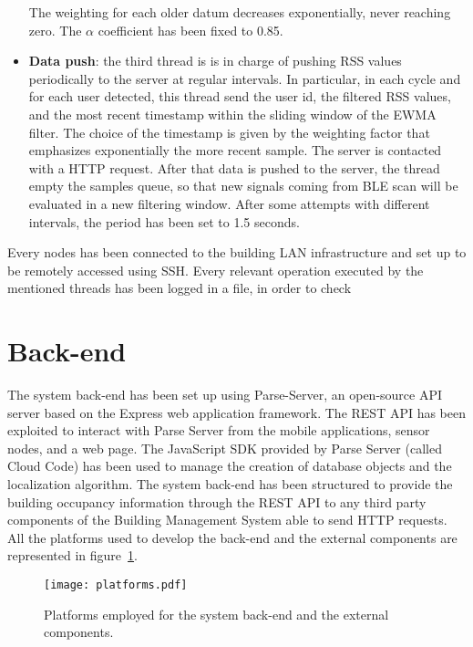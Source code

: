 \begin{itemize}
The weighting for each older datum decreases exponentially, never reaching zero. The $\alpha$ coefficient has been fixed to 0.85.
\item \textbf{Data push}: the third thread is is in charge of pushing RSS values periodically to the server at regular intervals. In particular, in each cycle and for each user detected, this thread send the user id, the filtered RSS values, and the most recent timestamp within the sliding window of the EWMA filter.
The choice of the timestamp is given by the weighting factor that emphasizes exponentially the more recent sample. The server is contacted with a HTTP request.
After that data is pushed to the server, the thread empty the samples queue, so that new signals coming from BLE scan will be evaluated in a new filtering window.
After some attempts with different intervals, the period has been set to 1.5 seconds.
\end{itemize}

Every nodes has been connected to the building LAN infrastructure and set up to be remotely accessed using SSH. Every relevant operation executed by the mentioned threads has been logged in a file, in order to check 

\section{Back-end}
\label{sec:back-end}
The system back-end has been set up using Parse-Server, an open-source API server based on the Express web application framework. The REST API has been exploited to interact with Parse Server from the mobile applications, sensor nodes, and a web page. The JavaScript SDK provided by Parse Server (called Cloud Code) has been used to manage the creation of database objects and the localization algorithm. The system back-end has been structured to provide the building occupancy information through the REST API to any third party components of the Building Management System able to send HTTP requests. All the platforms used to develop the back-end and the external components are represented in figure~\ref{fig:platforms}.

\begin{figure}[h!tb]
\centering
\texttt{[image: platforms.pdf]}
\caption[Platforms employed for the system back-end and the external components.]{Platforms employed for the system back-end and the external components.}
\label{fig:platforms}
\end{figure}

